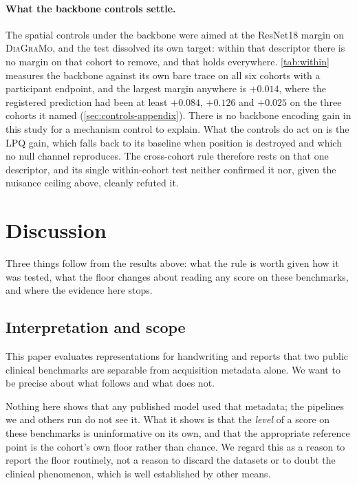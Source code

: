 \documentclass[10pt,a4paper]{article}
\begin{document}
\paragraph{What the backbone controls settle.} The spatial controls under the backbone were aimed at
the ResNet18 margin on \textsc{DiaGraMo}, and the test dissolved its own target: within that
descriptor there is no margin on that cohort to remove, and that holds
everywhere. \cref{tab:within} measures the backbone against its own bare trace on all six cohorts
with a participant endpoint, and the largest margin anywhere is $+0.014$, where the registered
prediction had been at least $+0.084$, $+0.126$ and $+0.025$ on the three cohorts it named
(\cref{sec:controls-appendix}). There is no backbone encoding gain in this study for a mechanism
control to explain. What the controls do act on is the LPQ gain, which falls back to its baseline
when position is destroyed and which no null channel reproduces.
The cross-cohort rule therefore rests on that one descriptor, and its single within-cohort test
neither confirmed it nor, given the nuisance ceiling above, cleanly refuted it.

\section{Discussion}
\label{sec:discussion}

Three things follow from the results above: what the rule is worth given how it was tested, what
the floor changes about reading any score on these benchmarks, and where the evidence here stops.


\subsection{Interpretation and scope}
\label{sec:scope}

This paper evaluates representations for handwriting and reports that two public clinical
benchmarks are separable from acquisition metadata alone. We want to be precise about what
follows and what does not.

Nothing here shows that any published model used that metadata; the pipelines we and others run do
not see it. What it shows is that the \emph{level} of a score on these benchmarks is uninformative
on its own, and that the appropriate reference point is the cohort's own floor rather than chance.
We regard this as a reason to report the floor routinely, not a reason to discard the datasets or
to doubt the clinical phenomenon, which is well established by other means.
\end{document}
